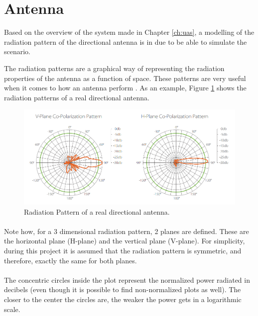 \section{Antenna}\label{sec:antenna}

Based on the overview of the system made in Chapter \ref{ch:uas}, a modelling of the radiation pattern of the directional antenna is in due to be able to simulate the scenario.

The radiation patterns are a graphical way of representing the radiation properties of the antenna as a function of space. These patterns are very useful when it comes to how an antenna perform \cite{Balanis97}. As an example, Figure \ref{fig:radpattern} shows the radiation patterns of a real directional antenna.

\begin{figure}[H]
	\centerline{
	\includegraphics[scale=0.5]{figures/radpattern.png}}
	\caption{Radiation Pattern of a real directional antenna.}
	\label{fig:radpattern}
\end{figure}

\paragraph{}Note how, for a 3 dimensional radiation pattern, 2 planes are defined. These are the horizontal plane (H-plane) and the vertical plane (V-plane). For simplicity, during this project it is assumed that the radiation pattern is symmetric, and therefore, exactly the same for both planes.

\paragraph{}The concentric circles inside the plot represent the normalized power radiated in decibels (even though it is possible to find non-normalized plots as well). The closer to the center the circles are, the weaker the power gets in a logarithmic scale. 

